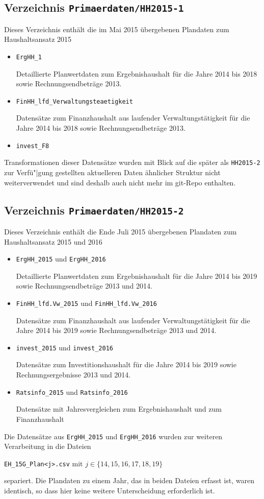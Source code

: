 \documentclass[a4paper,11pt,twoside]{article}
\begin{document}
\subsection{Verzeichnis \texttt{Primaerdaten/HH2015-1}}
Dieses Verzeichnis enthält die im Mai 2015 übergebenen Plandaten zum
Haushaltsansatz 2015
\begin{itemize}
\item \texttt{ErgHH\_1} 

Detaillierte Planwertdaten zum Ergebnishaushalt für die Jahre 2014 bis 2018
sowie Rechnungsendbeträge 2013.
\item \texttt{FinHH\_lfd\_Verwaltungsteaetigkeit} 

Datensätze zum Finanzhaushalt aus laufender Verwaltungstätigkeit für die Jahre
2014 bis 2018 sowie Rechnungsendbeträge 2013.
\item \texttt{invest\_F8} 
\end{itemize}
Transformationen dieser Datensätze wurden mit Blick auf die später als
\texttt{HH2015-2} zur Verfü"|gung gestellten aktuelleren Daten ähnlicher
Struktur nicht weiterverwendet und sind deshalb auch nicht mehr im git-Repo
enthalten.

\subsection{Verzeichnis \texttt{Primaerdaten/HH2015-2}}
Dieses Verzeichnis enthält die Ende Juli 2015 übergebenen Plandaten zum
Haushaltsansatz 2015 und 2016
\begin{itemize}
\item \texttt{ErgHH\_2015} und \texttt{ErgHH\_2016} 

Detaillierte Planwertdaten zum Ergebnishaushalt für die Jahre 2014 bis 2019
sowie Rechnungsendbeträge 2013 und 2014.
\item \texttt{FinHH\_lfd.Vw\_2015} und \texttt{FinHH\_lfd.Vw\_2016}

Datensätze zum Finanzhaushalt aus laufender Verwaltungstätigkeit für die Jahre
2014 bis 2019 sowie Rechnungsendbeträge 2013 und 2014.
\item \texttt{invest\_2015} und \texttt{invest\_2016} 

Datensätze zum Investitionshaushalt für die Jahre 2014 bis 2019 sowie
Rechnungsergebnisse 2013 und 2014.
\item \texttt{Ratsinfo\_2015} und \texttt{Ratsinfo\_2016} 

Datensätze mit Jahresvergleichen zum Ergebnishaushalt und zum Finanzhaushalt
\end{itemize}
Die Datensätze aus \texttt{ErgHH\_2015} und \texttt{ErgHH\_2016} wurden zur
weiteren Verarbeitung in die Dateien
\begin{center}
  \texttt{EH\_15G\_Plan<j>.csv} mit $j\in \{14,15,16,17,18,19\}$
\end{center}
separiert.  Die Plandaten zu einem Jahr, das in beiden Dateien erfasst ist,
waren identisch, so dass hier keine weitere Unterscheidung erforderlich ist.
\end{document}
